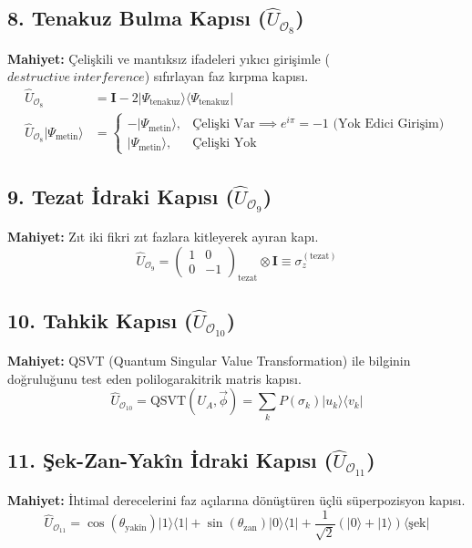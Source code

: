 \documentclass[11pt, a4paper]{article}
\begin{document}
\subsection{8. Tenakuz Bulma Kapısı ($\hat{U}_{\mathcal{O}_8}$)}
\textbf{Mahiyet:} Çelişkili ve mantıksız ifadeleri yıkıcı girişimle ($destructive\ interference$) sıfırlayan faz kırpma kapısı.
\begin{align}
\hat{U}_{\mathcal{O}_8} &= \mathbf{I} - 2 |\Psi_{\text{tenakuz}}\rangle \langle \Psi_{\text{tenakuz}}| \\
\hat{U}_{\mathcal{O}_8} |\Psi_{\text{metin}}\rangle &= \begin{cases} -|\Psi_{\text{metin}}\rangle, & \text{Çelişki Var} \implies e^{i\pi} = -1 \text{ (Yok Edici Girişim)} \\ |\Psi_{\text{metin}}\rangle, & \text{Çelişki Yok} \end{cases}
\end{align}

\subsection{9. Tezat İdraki Kapısı ($\hat{U}_{\mathcal{O}_9}$)}
\textbf{Mahiyet:} Zıt iki fikri zıt fazlara kitleyerek ayıran kapı.
\begin{equation}
\hat{U}_{\mathcal{O}_9} = \begin{pmatrix} 1 & 0 \\ 0 & -1 \end{pmatrix}_{\text{tezat}} \otimes \mathbf{I} \equiv \sigma_z^{(\text{tezat})}
\end{equation}

\subsection{10. Tahkik Kapısı ($\hat{U}_{\mathcal{O}_{10}}$)}
\textbf{Mahiyet:} QSVT (Quantum Singular Value Transformation) ile bilginin doğruluğunu test eden polilogarakitrik matris kapısı.
\begin{equation}
\hat{U}_{\mathcal{O}_{10}} = \text{QSVT}(U_A, \vec{\phi}) = \sum_k P(\sigma_k) |u_k\rangle \langle v_k|
\end{equation}

\subsection{11. Şek-Zan-Yakîn İdraki Kapısı ($\hat{U}_{\mathcal{O}_{11}}$)}
\textbf{Mahiyet:} İhtimal derecelerini faz açılarına dönüştüren üçlü süperpozisyon kapısı.
\begin{equation}
\hat{U}_{\mathcal{O}_{11}} = \cos(\theta_{\text{yakîn}}) |1\rangle\langle 1| + \sin(\theta_{\text{zan}}) |0\rangle\langle 1| + \frac{1}{\sqrt{2}} (|0\rangle + |1\rangle) \langle \text{şek}|
\end{equation}
\end{document}
